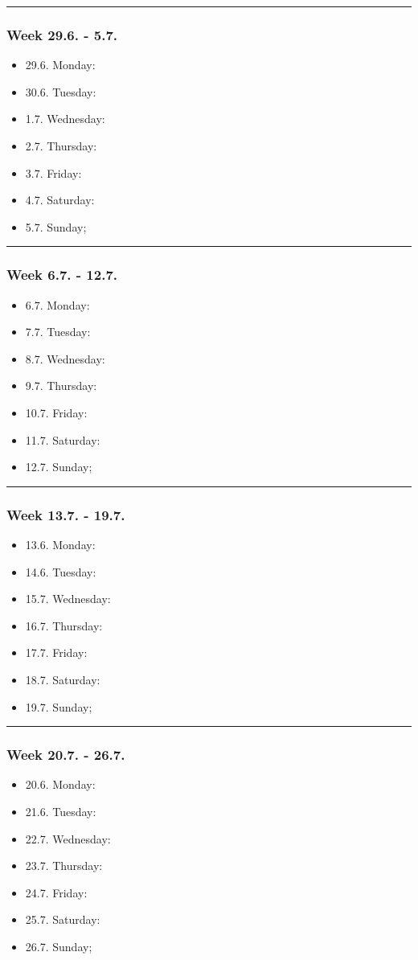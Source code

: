 \clearpage
\hrule
\subsubsection*{Week 29.6. - 5.7.}
\begin{itemize}
  \item 29.6. Monday:
  \item 30.6. Tuesday:
  \item  1.7. Wednesday:
  \item  2.7. Thursday:
  \item  3.7. Friday:
  \item  4.7. Saturday:
  \item  5.7. Sunday;
\end{itemize}

\hrule
\subsubsection*{Week 6.7. - 12.7.}
\begin{itemize}
  \item  6.7. Monday:
  \item  7.7. Tuesday:
  \item  8.7. Wednesday:
  \item  9.7. Thursday:
  \item 10.7. Friday:
  \item 11.7. Saturday:
  \item 12.7. Sunday;
\end{itemize}

\hrule
\subsubsection*{Week 13.7. - 19.7.}
\begin{itemize}
  \item 13.6. Monday:
  \item 14.6. Tuesday:
  \item 15.7. Wednesday:
  \item 16.7. Thursday:
  \item 17.7. Friday:
  \item 18.7. Saturday:
  \item 19.7. Sunday;
\end{itemize}

\clearpage
\hrule
\subsubsection*{Week 20.7. - 26.7.}
\begin{itemize}
  \item 20.6. Monday:
  \item 21.6. Tuesday:
  \item 22.7. Wednesday:
  \item 23.7. Thursday:
  \item 24.7. Friday:
  \item 25.7. Saturday:
  \item 26.7. Sunday;
\end{itemize}

